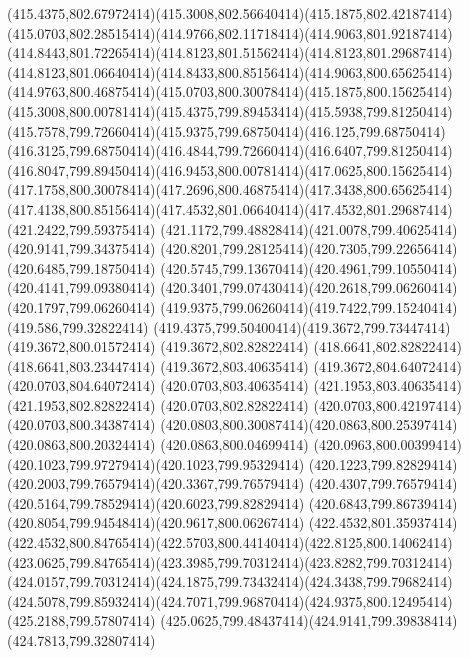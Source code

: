 {{	\curveto(415.4375,802.67972414)(415.3008,802.56640414)(415.1875,802.42187414)
	\curveto(415.0703,802.28515414)(414.9766,802.11718414)(414.9063,801.92187414)
	\curveto(414.8443,801.72265414)(414.8123,801.51562414)(414.8123,801.29687414)
	\curveto(414.8123,801.06640414)(414.8433,800.85156414)(414.9063,800.65625414)
	\curveto(414.9763,800.46875414)(415.0703,800.30078414)(415.1875,800.15625414)
	\curveto(415.3008,800.00781414)(415.4375,799.89453414)(415.5938,799.81250414)
	\curveto(415.7578,799.72660414)(415.9375,799.68750414)(416.125,799.68750414)
	\curveto(416.3125,799.68750414)(416.4844,799.72660414)(416.6407,799.81250414)
	\curveto(416.8047,799.89450414)(416.9453,800.00781414)(417.0625,800.15625414)
	\curveto(417.1758,800.30078414)(417.2696,800.46875414)(417.3438,800.65625414)
	\curveto(417.4138,800.85156414)(417.4532,801.06640414)(417.4532,801.29687414)
	\closepath
	\moveto(421.2422,799.59375414)
	\curveto(421.1172,799.48828414)(421.0078,799.40625414)(420.9141,799.34375414)
	\curveto(420.8201,799.28125414)(420.7305,799.22656414)(420.6485,799.18750414)
	\curveto(420.5745,799.13670414)(420.4961,799.10550414)(420.4141,799.09380414)
	\curveto(420.3401,799.07430414)(420.2618,799.06260414)(420.1797,799.06260414)
	\curveto(419.9375,799.06260414)(419.7422,799.15240414)(419.586,799.32822414)
	\curveto(419.4375,799.50400414)(419.3672,799.73447414)(419.3672,800.01572414)
	\lineto(419.3672,802.82822414)
	\lineto(418.6641,802.82822414)
	\lineto(418.6641,803.23447414)
	\lineto(419.3672,803.40635414)
	\lineto(419.3672,804.64072414)
	\lineto(420.0703,804.64072414)
	\lineto(420.0703,803.40635414)
	\lineto(421.1953,803.40635414)
	\lineto(421.1953,802.82822414)
	\lineto(420.0703,802.82822414)
	\lineto(420.0703,800.42197414)
	\lineto(420.0703,800.34387414)
	\curveto(420.0803,800.30087414)(420.0863,800.25397414)(420.0863,800.20324414)
	\lineto(420.0863,800.04699414)
	\curveto(420.0963,800.00399414)(420.1023,799.97279414)(420.1023,799.95329414)
	\curveto(420.1223,799.82829414)(420.2003,799.76579414)(420.3367,799.76579414)
	\curveto(420.4307,799.76579414)(420.5164,799.78529414)(420.6023,799.82829414)
	\curveto(420.6843,799.86739414)(420.8054,799.94548414)(420.9617,800.06267414)
	\closepath
	\moveto(422.4532,801.35937414)
	\curveto(422.4532,800.84765414)(422.5703,800.44140414)(422.8125,800.14062414)
	\curveto(423.0625,799.84765414)(423.3985,799.70312414)(423.8282,799.70312414)
	\curveto(424.0157,799.70312414)(424.1875,799.73432414)(424.3438,799.79682414)
	\curveto(424.5078,799.85932414)(424.7071,799.96870414)(424.9375,800.12495414)
	\lineto(425.2188,799.57807414)
	\curveto(425.0625,799.48437414)(424.9141,799.39838414)(424.7813,799.32807414)
}}
